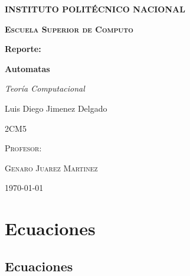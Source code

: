\documentclass[11pt,a4paper]{report}
\begin{document}
	\begin{titlepage}
		\centering
		{\scshape\huge\bfseries INSTITUTO POLITÉCNICO NACIONAL \par}
		\vspace{0.7cm}
		{\scshape\LARGE\bfseries Escuela Superior de Computo \par}
		\vspace{0.5cm}
		{\scshape\Large \par}
		\vspace{1.5cm}
		{\Large\bfseries Reporte: \par}
		{\huge\bfseries Automatas \par}
		\vspace{2cm}
		{\LARGE\itshape Teoría Computacional\par}
		\vspace{0.2cm}
		{\Large Luis Diego Jimenez Delgado\par}
		\vfill
			{\scshape\Large 2CM5 \par}
			\vspace{0.5cm}
			{\scshape\large Profesor: \par}
			{\scshape\Large Genaro Juarez Martinez \par}
		\vfill
		{\large \today}
	\end{titlepage}
 
	\tableofcontents{}

	\chapter{Ecuaciones}
	
		\section{Ecuaciones}
		
			
\end{document}
